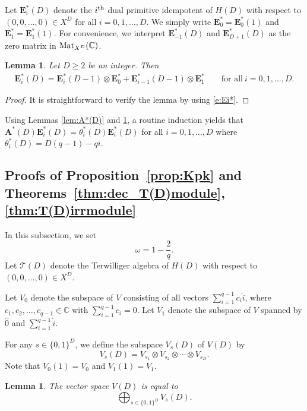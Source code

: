 \documentclass[pdftex]{sigma}%
\def\A{\mathbf A}
\def\E{\mathbf E}
\def\C{\mathbb C}
\def\Mat{{\rm Mat}}
\def\T{\mathcal T}
\numberwithin{equation}{section}
\newtheorem{Lemma}[Theorem]{Lemma}
\begin{document}
Let $\E_i^*(D)$ denote the $i^{{\rm th}}$ dual primitive idempotent of $H(D)$ with respect to ${(0,0,\dots,0)\!\in\! X^D}$ for all $i=0,1,\dots,D$. We simply write $\E^*_0=\E^*_0(1)$ and $\E^*_1=\E^*_1(1)$. For convenience, we interpret $\E_{-1}^*(D)$ and $\E_{D+1}^*(D)$ as the zero matrix in $\Mat_{X^D}(\C)$.

\begin{Lemma}\label{lem:Ei*(D)}
Let $D\geq 2$ be an integer. Then
\begin{gather*}
\E_i^*(D)=\E_i^*(D-1)\otimes \E^*_0+\E_{i-1}^*(D-1)\otimes \E_1^*
\qquad
\text{for all}\ i=0,1,\dots,D.
\end{gather*}
\end{Lemma}
\begin{proof}
It is straightforward to verify the lemma by using \eqref{e:Ei*}.
\end{proof}

Using Lemmas \ref{lem:A*(D)} and \ref{lem:Ei*(D)}, a routine induction yields that $\A^*(D) \E_i^*(D)=\theta_i^*(D)\E_i^*(D)$ for all $i=0,1,\dots,D$ where
$\theta_i^*(D)=D(q-1)-qi$.

\subsection{Proofs of Proposition~\ref{prop:Kpk} and Theorems~\ref{thm:dec_T(D)module}, \ref{thm:T(D)irrmodule}}

In this subsection, we set
\[
\omega=1-\frac{2}{q}.
\]
Let $\T(D)$ denote the Terwilliger algebra of $H(D)$ with respect to $(0,0,\dots,0)\in X^D$.

\begin{Definition}\label{defn:V0&V1}
Let $V_0$ denote the subspace of $V$ consisting of all vectors $\sum_{i=1}^{q-1} c_i \hat i$, where $c_1,c_2,\dots,c_{q-1}\in \C$ with $\sum_{i=1}^{q-1} c_i=0$.
Let $V_1$ denote the subspace of $V$ spanned by
$\hat 0$ and $\sum_{i=1}^{q-1} \hat i$.
\end{Definition}

\begin{Definition}\label{defn:Vs(D)}
For any $s\in \{0,1\}^D$, we define the subspace $V_s(D)$ of $V(D)$ by
\[
V_s(D)=V_{s_1}\otimes V_{s_2}\otimes \cdots \otimes V_{s_D}.
\]
Note that $V_0(1)=V_0$ and $V_1(1)=V_1$.
\end{Definition}

\begin{Lemma}\label{lem:decV(D)_HD}
The vector space $V(D)$ is equal to
\[
\bigoplus_{s\in \{0,1\}^D} V_s(D).
\]
\end{Lemma}
\end{document}
